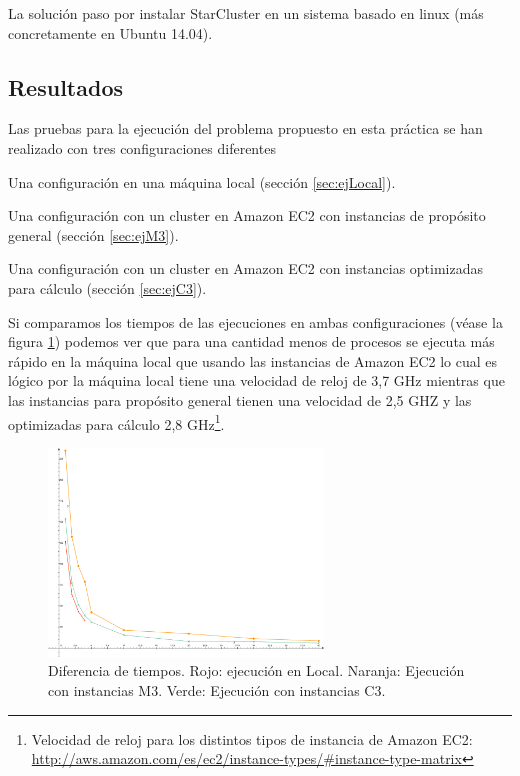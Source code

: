 \documentclass{article}
\begin{document}
	La solución paso por instalar StarCluster en un sistema basado en linux (más concretamente en Ubuntu 14.04).

\subsection{Resultados}\label{sec:ConclusionResultados}
	Las pruebas para la ejecución del problema propuesto en esta práctica se han realizado con tres configuraciones diferentes
{\setlength{\parskip}{0mm}\begin{enumerate}
{\setlength{\parskip}{0mm}
	\item Una configuración en una máquina local (sección \ref{sec:ejLocal}).
	\item Una configuración con un cluster en Amazon EC2 con instancias de propósito general (sección \ref{sec:ejM3}).
	\item Una configuración con un cluster en Amazon EC2 con instancias optimizadas para cálculo (sección \ref{sec:ejC3}).
}
\end{enumerate}}
	Si comparamos los tiempos de las ejecuciones en ambas configuraciones (véase la figura \ref{fig:time}) podemos ver que para una cantidad menos de procesos se ejecuta más rápido en la máquina local que usando las instancias de Amazon EC2 lo cual es lógico por la máquina local tiene una velocidad de reloj de 3,7 GHz mientras que las instancias para propósito general tienen una velocidad de 2,5 GHZ y las optimizadas para cálculo 2,8 GHz\footnote{ Velocidad de reloj para los distintos tipos de instancia de Amazon EC2: \url{http://aws.amazon.com/es/ec2/instance-types/\#instance-type-matrix}}.


\begin{figure}[h]
  \centering
    \includegraphics[width=0.65\textwidth]{img/time.pdf}
  \caption{Diferencia de tiempos. Rojo: ejecución en Local. Naranja: Ejecución con instancias M3. Verde: Ejecución con instancias C3.}
  \label{fig:time}
\end{figure}
\end{document}
